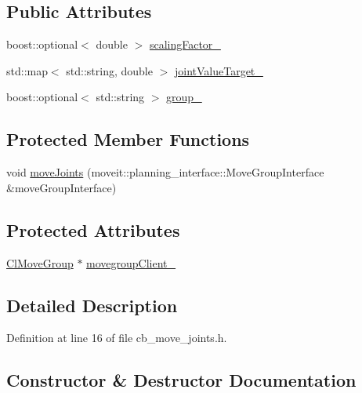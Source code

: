 \subsection*{Public Attributes}
\begin{DoxyCompactItemize}
\item 
boost\+::optional$<$ double $>$ \hyperlink{classcl__move__group__interface_1_1CbMoveJoints_a2480db16c4bf55a40701c00cd2afe9a0}{scaling\+Factor\+\_\+}
\item 
std\+::map$<$ std\+::string, double $>$ \hyperlink{classcl__move__group__interface_1_1CbMoveJoints_a8103f7c923a34d9bf5a2c374ff88a277}{joint\+Value\+Target\+\_\+}
\item 
boost\+::optional$<$ std\+::string $>$ \hyperlink{classcl__move__group__interface_1_1CbMoveJoints_afc75b1e5403e49583930531bcb6508eb}{group\+\_\+}
\end{DoxyCompactItemize}
\subsection*{Protected Member Functions}
\begin{DoxyCompactItemize}
\item 
void \hyperlink{classcl__move__group__interface_1_1CbMoveJoints_ad91d243eb8a818e240d85e5a7fdea68d}{move\+Joints} (moveit\+::planning\+\_\+interface\+::\+Move\+Group\+Interface \&move\+Group\+Interface)
\end{DoxyCompactItemize}
\subsection*{Protected Attributes}
\begin{DoxyCompactItemize}
\item 
\hyperlink{classcl__move__group__interface_1_1ClMoveGroup}{Cl\+Move\+Group} $\ast$ \hyperlink{classcl__move__group__interface_1_1CbMoveJoints_aa5749bbc6bb5f09069e9e8115326f024}{movegroup\+Client\+\_\+}
\end{DoxyCompactItemize}


\subsection{Detailed Description}


Definition at line 16 of file cb\+\_\+move\+\_\+joints.\+h.



\subsection{Constructor \& Destructor Documentation}
\mbox{\label{classcl__move__group__interface_1_1CbMoveJoints_a085919fd766e50098cbe9782de3303c6}} 
